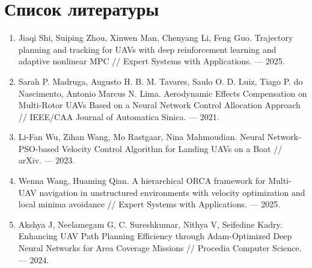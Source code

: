 

\section*{Список литературы}

\begin{enumerate}

    \item Jiaqi Shi, Suiping Zhou, Xinwen Man, Chenyang Li, Feng Guo. Trajectory planning and tracking for UAVs with deep reinforcement learning and adaptive nonlinear MPC //
    Expert Systems with Applications. — 2025.

    \item Sarah P. Madruga, Augusto H. B. M. Tavares, Saulo O. D. Luiz, Tiago P. do Nascimento, Antonio Marcus N. Lima. Aerodynamic Effects Compensation on Multi-Rotor UAVs Based on a Neural Network Control Allocation Approach //
    IEEE/CAA Journal of Automatica Sinica. — 2021.

    \item Li-Fan Wu, Zihan Wang, Mo Rastgaar, Nina Mahmoudian. Neural Network-PSO-based Velocity Control Algorithm for Landing UAVs on a Boat //
    arXiv. — 2023.

    \item Wenna Wang, Huaming Qian. A hierarchical ORCA framework for Multi-UAV navigation in unstructured environments with velocity optimization and local minima avoidance //
    Expert Systems with Applications. — 2025.

    \item Akshya J, Neelamegam G, C. Sureshkumar, Nithya V, Seifedine Kadry. Enhancing UAV Path Planning Efficiency through Adam-Optimized Deep Neural Networks for Area Coverage Missions //
    Procedia Computer Science. — 2024.


\end{enumerate}
